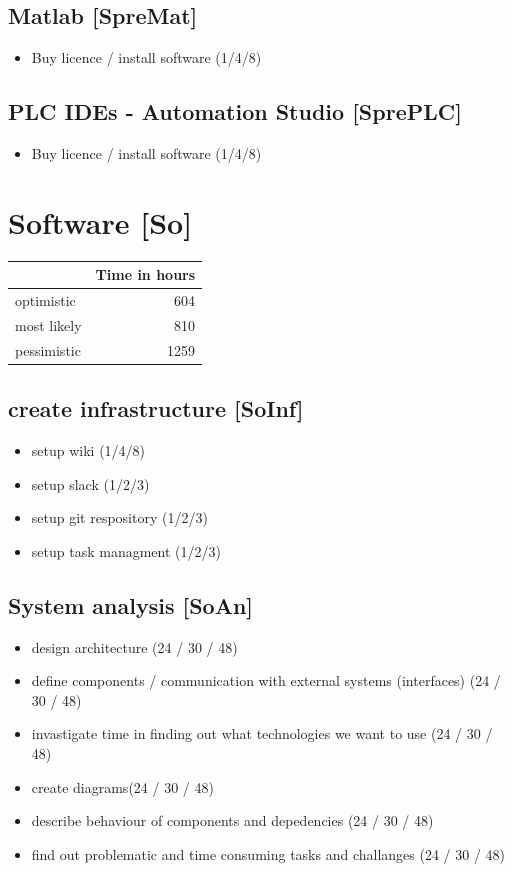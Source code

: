 \documentclass
[
 12pt, %
       DIV12,
       a4paper, %
       oneside, %
       titlepage, %
       parskip=half, %
       headings=normal, %
       listof=totoc, %
       bibliography=totoc, %
       index=totoc, %
       captions=tableheading, %
       ]{scrreprt}
\begin{document}
\section{Matlab [SpreMat]}
\label{sec:orgda25cf6}
\begin{itemize}
\item Buy licence / install software  (1/4/8)
\end{itemize}

\section{PLC IDEs - Automation Studio [SprePLC]}
\label{sec:org003d4a8}
\begin{itemize}
\item Buy licence / install software (1/4/8)
\end{itemize}

\chapter{Software [So]}
\label{sec:orgdf36b5c}

\begin{center}
\begin{tabular}{|l|r|}
	\hline
	& Time in hours\\
	\hline
	optimistic & 604\\
	\hline
	most likely & 810\\
	\hline
	pessimistic & 1259\\
	\hline
\end{tabular}
\end{center}
\section{create infrastructure [SoInf]}
\label{sec:org06c00a2}
\begin{itemize}
\item setup wiki (1/4/8)
\item setup slack (1/2/3)
\item setup git respository (1/2/3)
\item setup task managment (1/2/3)
\end{itemize}
\section{System analysis [SoAn]}
\label{sec:org498acda}
\begin{itemize}
\item design architecture (24 / 30 / 48)
\item define components / communication with external systems (interfaces) (24 / 30 / 48)
\item invastigate time in finding out what technologies we want to use (24 / 30 / 48)
\item create diagrams(24 / 30 / 48)
\item describe behaviour of components and depedencies (24 / 30 / 48)
\item find out problematic and time consuming tasks and challanges (24 / 30 / 48)
\end{itemize}
\end{document}
